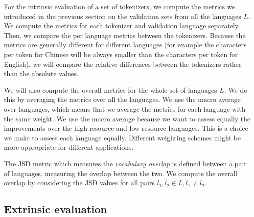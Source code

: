 For the intrinsic evaluation of a set of tokenizers, we compute the metrics we introduced in the previous section on the validation sets from all the languages $L$. We compute the metrics for each tokenizer and validation language separately. Then, we compare the per language metrics between the tokenizers. Because the metrics are generally different for different languages (for example the characters per token for Chinese will be always smaller than the characters per token for English), we will compare the relative differences between the tokenizers rather than the absolute values.

We will also compute the overall metrics for the whole set of languages $L$. We do this by averaging the metrics over all the languages. We use the macro average over languages, which means that we average the metrics for each language with the same weight. We use the macro average because we want to assess equally the improvements over the high-resource and low-resource languages. This is a choice we make to assess each language equally. Different weighting schemes might be more appropriate for different applications.

The JSD metric which measures the \textit{vocabulary overlap} is defined between a pair of languages, measuring the overlap between the two. We compute the overall overlap by considering the JSD values for all pairs $l_1, l_2 \in L, l_1 \neq l_2$.

\subsection{Extrinsic evaluation}

